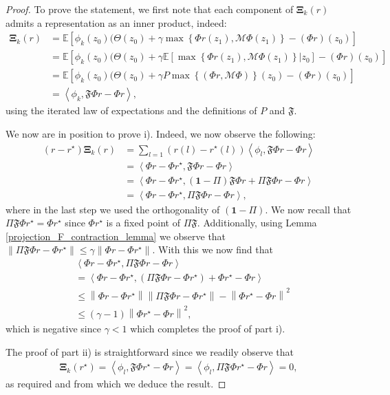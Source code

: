 \documentclass{article}
\begin{document}
\begin{proof}
To prove the statement, we first note that each component of $\boldsymbol{\Xi}_k(r)$ admits a representation as an inner product, indeed: 
\begin{align*}
\boldsymbol{\Xi}_k(r)&=\mathbb{E}\left[\phi_k(z_0)(\Theta(z_0)+\gamma\max\left\{\Phi r(z_1),\mathcal{M}\Phi(z_1)\right\}-(\Phi r)(z_0)\right] 
\\&=\mathbb{E}\left[\phi_k(z_0)(\Theta(z_0)+\gamma\mathbb{E}\left[\max\left\{\Phi r(z_1),\mathcal{M}\Phi(z_1)\right\}|z_0\right]-(\Phi r)(z_0)\right]
\\&=\mathbb{E}\left[\phi_k(z_0)(\Theta(z_0)+\gamma P\max\left\{\left(\Phi r,\mathcal{M}\Phi\right)\right\}(z_0)-(\Phi r)(z_0)\right]
\\&=\left\langle\phi_k,\mathfrak{F}\Phi r-\Phi r\right\rangle,
\end{align*}
using the iterated law of expectations and the definitions of $P$ and $\mathfrak{F}$.

We now are in position to prove i). Indeed, we now observe the following:
\begin{align*}
\left(r-r^\star\right)\boldsymbol{\Xi}_k(r)&=\sum_{l=1}\left(r(l)-r^\star(l)\right)\left\langle\phi_l,\mathfrak{F}\Phi r -\Phi r\right\rangle
\\&=\left\langle\Phi r -\Phi r^\star, \mathfrak{F}\Phi r -\Phi r\right\rangle
\\&=\left\langle\Phi r -\Phi r^\star, (\boldsymbol{1}-\Pi)\mathfrak{F}\Phi r+\Pi \mathfrak{F}\Phi r -\Phi r\right\rangle
\\&=\left\langle\Phi r -\Phi r^\star, \Pi \mathfrak{F}\Phi r -\Phi r\right\rangle,
\end{align*}
where in the last step we used the orthogonality of $(\boldsymbol{1}-\Pi)$. We now recall that $\Pi \mathfrak{F}\Phi r^\star=\Phi r^\star$ since $\Phi r^\star$ is a fixed point of $\Pi \mathfrak{F}$. Additionally, using Lemma \ref{projection_F_contraction_lemma} we observe that $\|\Pi \mathfrak{F}\Phi r -\Phi r^\star\| \leq \gamma \|\Phi r -\Phi r^\star\|$. With this we now find that
\begin{align*}
&\left\langle\Phi r -\Phi r^\star, \Pi \mathfrak{F}\Phi r -\Phi r\right\rangle    
\\&=\left\langle\Phi r -\Phi r^\star, (\Pi \mathfrak{F}\Phi r -\Phi r^\star)+ \Phi r^\star -\Phi r\right\rangle
\\&\leq\left\|\Phi r -\Phi r^\star\right\|\left\|\Pi \mathfrak{F}\Phi r -\Phi r^\star\right\|- \left\|\Phi r^\star -\Phi r\right\|^2
\\&\leq(\gamma -1)\left\|\Phi r^\star -\Phi r\right\|^2,
\end{align*}
which is negative since $\gamma<1$ which completes the proof of part i).

The proof of part ii) is straightforward since we readily observe that
\begin{align*}
    \boldsymbol{\Xi}_k(r^\star)= \left\langle\phi_l, \mathfrak{F}\Phi r^\star-\Phi r\right\rangle= \left\langle\phi_l, \Pi \mathfrak{F}\Phi r^\star-\Phi r\right\rangle=0,
\end{align*}
as required and from which we deduce the result.
\end{proof}
\end{document}
